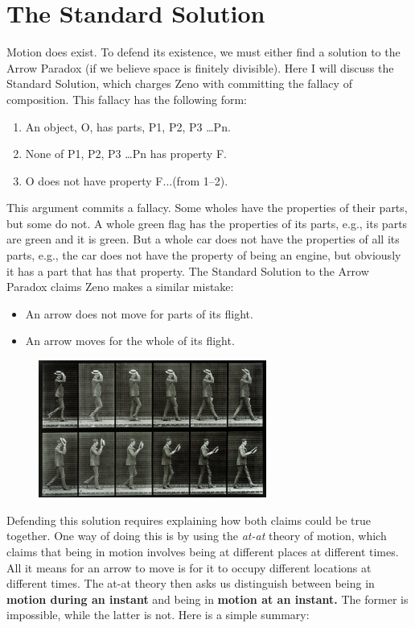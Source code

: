 \documentclass[oneside]{article}
\begin{document}
 \section*{The Standard Solution}
Motion does exist. To defend its existence, we must either find a solution to the Arrow Paradox (if we believe space is finitely divisible). Here I will discuss the Standard Solution, which charges Zeno with committing the fallacy of composition. This fallacy has the following form: 

\begin{enumerate}
\item An object, O, has parts, P1, P2, P3 \ldots{Pn}.
\item None of P1, P2, P3 \ldots{Pn} has property F. 
\item O does not have property F...(from 1--2). 
\end{enumerate}
This argument commits a fallacy. Some wholes have the properties of their parts, but some do not. A whole green flag has the properties of its parts, e.g., its parts are green and it is green. But a whole car does not have the properties of all its parts, e.g., the car does not have the property of being an engine, but obviously it has a part that has that property. The Standard Solution to the Arrow Paradox claims Zeno makes a similar mistake: 
\begin{itemize}
\item An arrow does not move for parts of its flight. 
\item An arrow moves for the whole of its flight. 
\end{itemize}
\begin{figure}[h]
\centering
  \includegraphics[width=75mm]{motion.jpg}
\end{figure}
Defending this solution requires explaining how both claims could be true together. One way of doing this is by using  the \emph{at-at} theory of motion, which claims that being in motion involves being at different places at different times. All it means for an arrow to move is for it to occupy different locations at different times. The at-at theory then asks us distinguish between being in \textbf{motion during an instant} and   being in \textbf{motion at an instant.} The former is impossible, while the latter is not. Here is a simple summary: 
\end{document}
